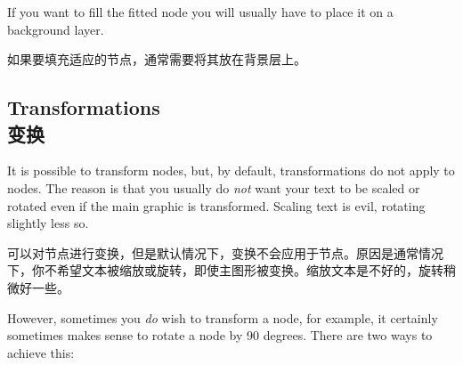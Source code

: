 \begin{codeexample}[preamble={\usetikzlibrary{fit,shapes.geometric}}]
\end{codeexample}

If you want to fill the fitted node you will usually have to place it on a
background layer.

如果要填充适应的节点，通常需要将其放在背景层上。

\begin{codeexample}[preamble={\usetikzlibrary{backgrounds,fit,shapes.geometric}}]
\end{codeexample}


\subsection{Transformations\\变换}
\label{section-nodes-transformations}

It is possible to transform nodes, but, by default, transformations do not
apply to nodes. The reason is that you usually do \emph{not} want your text to
be scaled or rotated even if the main graphic is transformed. Scaling text is
evil, rotating slightly less so.

可以对节点进行变换，但是默认情况下，变换不会应用于节点。原因是通常情况下，你不希望文本被缩放或旋转，即使主图形被变换。缩放文本是不好的，旋转稍微好一些。

However, sometimes you \emph{do} wish to transform a node, for example, it
certainly sometimes makes sense to rotate a node by 90 degrees. There are two
ways to achieve this:


